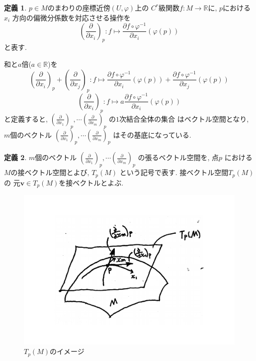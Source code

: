 \documentclass[dvipdfmx,cjk]{beamer}
\theoremstyle{definition}
\newtheorem{dfn}{\textbf{ 定義 }}
\begin{document}
\begin{frame}
  \frametitle{}
  \begin{dfn}
    $p\in M$のまわりの座標近傍$(U,\varphi)$上の
    $C^r$級関数$f:M\to \mathbb{R}$に, $p$における$x_i$
    方向の偏微分係数を対応させる操作を
    $$\left(\frac{\partial}{\partial x_i}
    \right)_p:f\mapsto 
    \frac{\partial f\circ \varphi^{-1}}{\partial x_i}(
      \varphi(p))$$
    と表す. 
  \end{dfn}
  和と$a$倍($a\in \mathbb{R}$)を
  $$\left(\frac{\partial}{\partial x_i}
  \right)_p+\left(\frac{\partial}{\partial x_j}
  \right)_p:f\mapsto 
  \frac{\partial f\circ \varphi^{-1}}{\partial x_i}(
    \varphi(p))+\frac{\partial f\circ \varphi^{-1}}{\partial x_j}(
      \varphi(p))$$
  $$\left(\frac{\partial}{\partial x_i}
  \right)_p:f\mapsto 
  a\frac{\partial f\circ \varphi^{-1}}{\partial x_i}(
    \varphi(p))$$
  と定義すると, 
  $\left(\frac{\partial}{\partial x_1}\right)_p, 
  \cdots 
  \left(\frac{\partial}{\partial x_m}\right)_p$
  の$1$次結合全体の集合
  はベクトル空間となり, 
  $m$個のベクトル
  $\left(\frac{\partial}{\partial x_1}\right)_p, 
  \cdots 
  \left(\frac{\partial}{\partial x_m}\right)_p$
  はその基底になっている. 
\end{frame}

\begin{frame}
  \begin{dfn}\label{def:tangent vector space}
    $m$個のベクトル
    $\left(\frac{\partial}{\partial x_1}\right)_p, 
    \cdots 
    \left(\frac{\partial}{\partial x_m}\right)_p$
    の張るベクトル空間を, 点$p$
    における$M$の接ベクトル空間とよび, 
    $T_p(M)$
    という記号で表す. 接ベクトル空間$T_p(M)$の
    元$\boldsymbol{v}\in T_p(M)$を接ベクトルとよぶ. 
  \end{dfn}
  \begin{figure}[H]
        \centering
        \includegraphics[keepaspectratio, scale=0.28]{tangentVectorSpace_2.pdf}
        \caption{$T_p(M)$のイメージ}
        \label{}
  \end{figure}
\end{frame}
\end{document}
